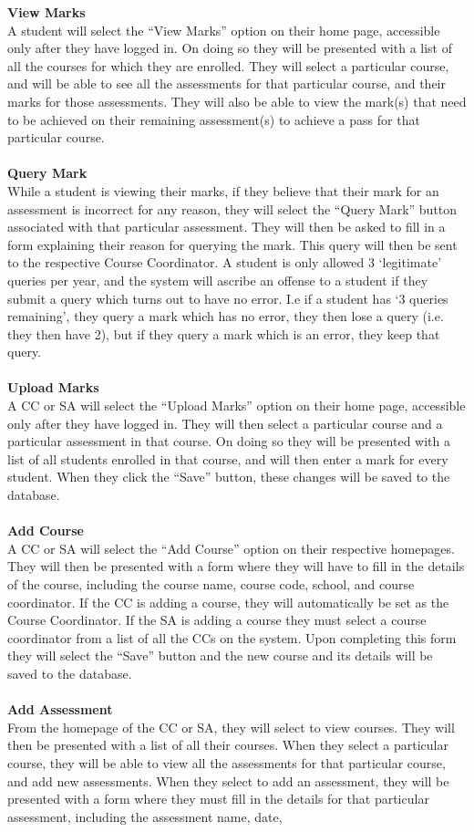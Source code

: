 \documentclass[paper=a4, fontsize=11pt]{scrartcl}
\numberwithin{equation}{section}		%
\numberwithin{figure}{section}			%
\numberwithin{table}{section}				%
\begin{document}
\textbf{View Marks}\\A student will select the “View Marks” option on their home page, accessible only after they have logged in. On doing so they will be presented with a list of all the courses for which they are enrolled. They will select a particular course, and will be able to see all the assessments for that particular course, and their marks for those assessments. They will also be able to view the mark(s) that need to be achieved on their remaining assessment(s) to achieve a pass for that particular course. \\\\ \textbf{Query Mark}\\While a student is viewing their marks, if they believe that their mark for an assessment is incorrect for any reason, they will select the “Query Mark” button associated with that particular assessment. They will then be asked to fill in a form explaining their reason for querying the mark. This query will then be sent to the respective Course Coordinator. A student is only allowed 3 ‘legitimate’ queries per year, and the system will ascribe an offense to a student if they submit a query which turns out to have no error. I.e if a student has ‘3 queries remaining’, they query a mark which has no error, they then lose a query (i.e. they then have 2), but if they query a mark which is an error, they keep that query. \\\\ \textbf{Upload Marks}\\A CC or SA will select the “Upload Marks” option on their home page, accessible only after they have logged in. They will then select a particular course and a particular assessment in that course. On doing so they will be presented with a list of all students enrolled in that course, and will then enter a mark for every student. When they click the “Save” button, these changes will be saved to the database.\\\\ \textbf{Add Course}\\A CC or SA will select the “Add Course” option on their respective homepages. They will then be presented with a form where they will have to fill in the details of the course, including the course name, course code, school, and course coordinator. If the CC is adding a course, they will automatically be set as the Course Coordinator. If the SA is adding a course they must select a course coordinator from a list of all the CCs on the system. Upon completing this form they will select the “Save” button and the new course and its details will be saved to the database.\\\\ \textbf{Add Assessment}\\From the homepage of the CC or SA, they will select to view courses. They will then be presented with a list of all their courses. When they select a particular course, they will be able to view all the assessments for that particular course, and add new assessments. When they select to add an assessment, they will be presented with a form where they must fill in the details for that particular assessment, including the assessment name, date, 
\end{document}
